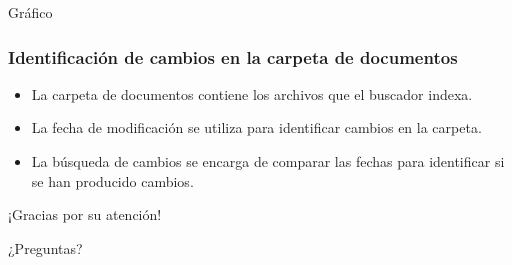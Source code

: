 \documentclass{beamer}
\begin{document}
\begin{frame}{Gráfico}
    \frametitle{Identificación de cambios en la carpeta de documentos}

    \begin{center}
\end{center}

\begin{itemize}
\item La carpeta de documentos contiene los archivos que el buscador indexa.
\item La fecha de modificación se utiliza para identificar cambios en la carpeta.
\item La búsqueda de cambios se encarga de comparar las fechas para identificar si se han producido cambios.
\end{itemize}
    
\end{frame}

\begin{frame}{¡Gracias por su atención!}
  \begin{center}
    \Large ¿Preguntas?
  \end{center}
\end{frame}
\end{document}

